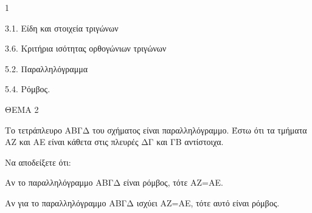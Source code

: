 \begin{ylh}{1}
    \item 3.1. Είδη και στοιχεία τριγώνων
    \item 3.6. Κριτήρια ισότητας ορθογώνιων τριγώνων
    \item 5.2. Παραλληλόγραμμα
    \item 5.4. Ρόμβος.
\end{ylh}

ΘΕΜΑ 2

Το τετράπλευρο ΑΒΓΔ του σχήματος είναι παραλληλόγραμμο. Έστω ότι τα τμήματα ΑΖ και ΑΕ είναι κάθετα στις πλευρές ΔΓ και ΓΒ αντίστοιχα.

Να αποδείξετε ότι:

\begin{alist}
\item Αν το παραλληλόγραμμο ΑΒΓΔ είναι ρόμβος, τότε ΑΖ=ΑΕ. 

\item Αν για το παραλληλόγραμμο ΑΒΓΔ ισχύει ΑΖ=ΑΕ, τότε αυτό είναι ρόμβος.



\begin{center}
\end{center}
\end{alist}
